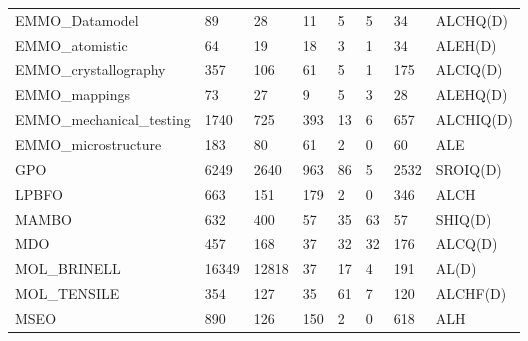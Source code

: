 \begin{table}
\begin{tabular}{m{3.5cm}m{1cm}m{1cm}m{1cm}m{1cm}m{1cm}m{1cm}m{1cm}}
EMMO\_Datamodel          &        89 &                28 &         11 &                    5 &                      5 &                       34 &         ALCHQ(D) \\
EMMO\_atomistic          &        64 &                19 &         18 &                    3 &                      1 &                       34 &          ALEH(D) \\
EMMO\_crystallography    &       357 &               106 &         61 &                    5 &                      1 &                      175 &         ALCIQ(D) \\
EMMO\_mappings           &        73 &                27 &          9 &                    5 &                      3 &                       28 &         ALEHQ(D) \\
EMMO\_mechanical\_testing &      1740 &               725 &        393 &                   13 &                      6 &                      657 &        ALCHIQ(D) \\
EMMO\_microstructure     &       183 &                80 &         61 &                    2 &                      0 &                       60 &              ALE \\
GPO                     &      6249 &              2640 &        963 &                   86 &                      5 &                     2532 &         SROIQ(D) \\
LPBFO                   &       663 &               151 &        179 &                    2 &                      0 &                      346 &             ALCH \\
MAMBO                   &       632 &               400 &         57 &                   35 &                     63 &                       57 &          SHIQ(D) \\
MDO                     &       457 &               168 &         37 &                   32 &                     32 &                      176 &          ALCQ(D) \\
MOL\_BRINELL             &     16349 &             12818 &         37 &                   17 &                      4 &                      191 &            AL(D) \\
MOL\_TENSILE             &       354 &               127 &         35 &                   61 &                      7 &                      120 &         ALCHF(D) \\
MSEO                    &       890 &               126 &        150 &                    2 &                      0 &                      618 &              ALH \\

\end{tabular}
\end{table}
